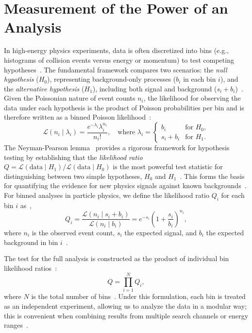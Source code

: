 \section{Measurement of the Power of an Analysis}
\label{sec:power_analysis}

In high-energy physics experiments, data is often discretized into bins (e.g., histograms of collision events versus energy or momentum) to test competing hypotheses~\cite{BakerCousins:1984}. The fundamental framework compares two scenarios: the \textit{null hypothesis} ($H_0$), representing background-only processes ($b_i$ in each bin $i$), and the \textit{alternative hypothesis} ($H_1$), including both signal and background ($s_i + b_i$)~\cite{NeymanPearson:1933}. Given the Poissonian nature of event counts $n_i$, the likelihood for observing the data under each hypothesis is the product of Poisson probabilities per bin and is therefore written as a binned Poisson likelihood~\cite{BakerCousins:1984,Cowan:2011}:
\begin{equation}
    \mathcal{L}(n_i \mid \lambda_i) = \frac{e^{-\lambda_i} \lambda_i^{n_i}}{n_i!}, \quad \text{where } \lambda_i = 
    \begin{cases}
        b_i & \text{for } H_0, \\
        s_i + b_i & \text{for } H_1.
    \end{cases}
\end{equation}
The Neyman-Pearson lemma~\parencite{NeymanPearson:1933} provides a rigorous framework for hypothesis testing by establishing that the \textit{likelihood ratio} $Q = \mathcal{L}(\text{data} \mid H_1)/\mathcal{L}(\text{data} \mid H_0)$ is the most powerful test statistic for distinguishing between two simple hypotheses, $H_0$ and $H_1$~\cite{NeymanPearson:1933,Cowan:2011}. This forms the basis for quantifying the evidence for new physics signals against known backgrounds~\cite{Cowan:2011,Read:2002}. For binned analyses in particle physics, we define the likelihood ratio $Q_i$ for each bin $i$ as~\cite{BakerCousins:1984,Cowan:2011},
\begin{equation}
Q_i = \frac{\mathcal{L}(n_i \mid s_i + b_i)}{\mathcal{L}(n_i \mid b_i)} = e^{-s_i} \left( 1+\frac{s_i}{b_i} \right)^{n_i},
\end{equation}
where $n_i$ is the observed event count, $s_i$ the expected signal, and $b_i$ the expected background in bin $i$~\cite{BakerCousins:1984,Cowan:2011}. 

The test for the full analysis is constructed as the product of individual bin likelihood ratios~\cite{BakerCousins:1984,Cowan:2011}:
\begin{equation}
Q = \prod_{i=1}^{N} Q_i,
\end{equation}
where $N$ is the total number of bins~\cite{BakerCousins:1984}. Under this formulation, each bin is treated as an independent experiment, allowing us to analyze the data in a modular way; this is convenient when combining results from multiple search channels or energy ranges~\cite{Read:2002,Cowan:2011}. 

